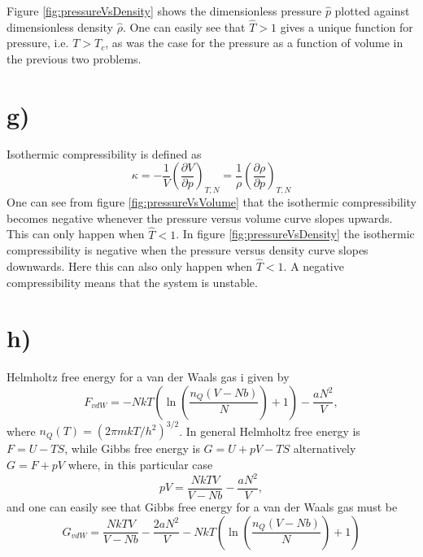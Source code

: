 \documentclass{article}
\begin{document}
Figure \ref{fig:pressureVsDensity} shows the dimensionless pressure $\hat{p}$ plotted against dimensionless density $\hat{\rho}$. One can easily see that $\hat{T}>1$ gives a unique function for pressure, i.e. $T>T_c$, as was the case for the pressure as a function of volume in the previous two problems.

\section*{g)}
Isothermic compressibility is defined as
\begin{equation}
\label{eq:isoComp}
\kappa = -\frac{1}{V}\left(\frac{\partial V}{\partial p} \right)_{T,N} = \frac{1}{\rho}\left(\frac{\partial \rho}{\partial p} \right)_{T,N}
\end{equation}
One can see from figure \ref{fig:pressureVsVolume} that the isothermic compressibility becomes negative whenever the pressure versus volume curve slopes upwards. This can only happen when $\hat{T} < 1$. In figure \ref{fig:pressureVsDensity} the isothermic compressibility is negative when the pressure versus density curve slopes downwards. Here this can also only happen when $\hat{T} < 1$. A negative compressibility means that the system is unstable.

\section*{h)}
Helmholtz free energy for a van der Waals gas i given by
\begin{equation}
F_{vdW} = -NkT\left(\ln \left( \frac{n_Q(V-Nb)}{N} \right) + 1 \right) - \frac{aN^2}{V},
\end{equation}
where $n_Q(T) = (2\pi mkT/h^2)^{3/2}$. In general Helmholtz free energy is $F = U - TS$, while Gibbs free energy is $G = U + pV - TS$ alternatively $G = F + pV$ where, in this particular case
\begin{equation}
\label{eq:pV}
pV = \frac{NkTV}{V-Nb}-\frac{aN^2}{V},
\end{equation}
and one can easily see that Gibbs free energy for a van der Waals gas must be
\begin{equation}
\label{eq:GvdW1}
G_{vdW} = \frac{NkTV}{V-Nb} -\frac{2aN^2}{V} - NkT\left(\ln \left( \frac{n_Q(V-Nb)}{N} \right) + 1 \right)
\end{equation}
\end{document}
